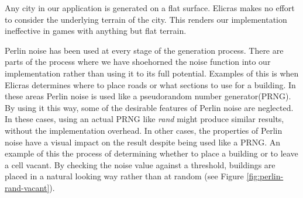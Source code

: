 Any city in our application is generated on a flat surface. Elicras makes no effort to consider the underlying terrain of the city. This renders our implementation ineffective in games with anything but flat terrain.
\par
Perlin noise has been used at every stage of the generation process. There are parts of the process where we have shoehorned the noise function into our implementation rather than using it to its full potential. Examples of this is when Elicras determines where to place roads or what sections to use for a building. In these areas Perlin noise is used like a pseudorandom number generator(PRNG). By using it this way, some of the desirable features of Perlin noise are neglected. In these cases, using an actual PRNG like \textit{rand}\cite{RandCRT} might produce similar results, without the implementation overhead. In other cases, the properties of Perlin noise have a visual impact on the result despite being used like a PRNG. An example of this the process of determining whether to place a building or to leave a cell vacant. By checking the noise value against a threshold, buildings are placed in a natural looking way rather than at random (see Figure \ref{fig:perlin-rand-vacant}).
	
